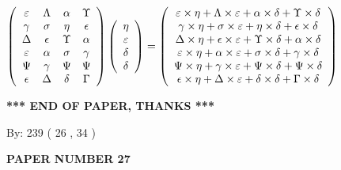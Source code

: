\documentclass[12pt]{article}
\begin{document}
$  %
 \left( \begin{array}
 {
 c
 c
 c
 c
 }
 \varepsilon & 
 \Lambda & 
 \alpha & 
 \Upsilon \\ 
 \gamma & 
 \sigma & 
 \eta & 
 \epsilon \\ 
 \Delta & 
 \epsilon & 
 \Upsilon & 
 \alpha \\ 
 \varepsilon & 
 \alpha & 
 \sigma & 
 \gamma \\ 
 \Psi & 
 \gamma & 
 \Psi & 
 \Psi \\ 
 \epsilon & 
 \Delta & 
 \delta & 
 \Gamma
 \end{array} \right)
 \left( \begin{array}
 {
 c
 }
 \eta \\ 
 \varepsilon \\ 
 \delta \\ 
 \delta
 \end{array} \right)
=
 \left( \begin{array}
 {
 c
 }
  \varepsilon \times  \eta +  \Lambda \times  \varepsilon +  \alpha \times  \delta +  \Upsilon \times  \delta \\ 
  \gamma \times  \eta +  \sigma \times  \varepsilon +  \eta \times  \delta +  \epsilon \times  \delta \\ 
  \Delta \times  \eta +  \epsilon \times  \varepsilon +  \Upsilon \times  \delta +  \alpha \times  \delta \\ 
  \varepsilon \times  \eta +  \alpha \times  \varepsilon +  \sigma \times  \delta +  \gamma \times  \delta \\ 
  \Psi \times  \eta +  \gamma \times  \varepsilon +  \Psi \times  \delta +  \Psi \times  \delta \\ 
  \epsilon \times  \eta +  \Delta \times  \varepsilon +  \delta \times  \delta +  \Gamma \times  \delta
 \end{array} \right)
$
 
   
   
   
   
\vspace{1.0in} 
{\textbf{\large{ *** END OF PAPER, THANKS *** }}} 
   
   
\hspace{1.0in} By: 
         239 (          26 ,           34 )
   
   
   
   
\newpage 
\setcounter{page}{ 
    27001 } 
   
   
 {\textbf{ \Large{ PAPER NUMBER           27  }}}
   
   
   
\end{document}
